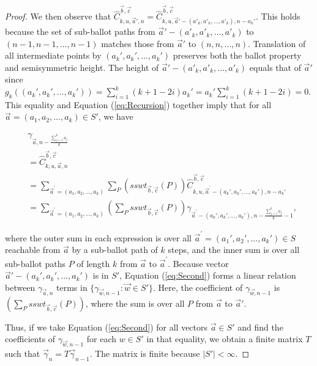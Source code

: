 \documentclass[11pt]{article}
\theoremstyle{remark}
\theoremstyle{definition}
\begin{document}
\begin{proof}
We then observe that $\widehat{C}_{k, u, \vec{a}', n}^{\vec{b}, \vec{c}} = \widehat{C}_{k, u, \vec{a}'-(a'_k, a'_k, \dots, a'_k), n-a_k'}^{\vec{b}, \vec{c}}$. This holds because the set of sub-ballot paths from $\vec{a}'-(a'_k, a'_k, \dots, a'_k)$ to $(n-1, n-1, \dots, n-1)$ matches those from $\vec{a}'$ to $(n, n, \dots, n)$. Translation of all intermediate points by $(a_k', a_k', \dots, a_k')$ preserves both the ballot property and semisymmetric height. The height of $\vec{a}'-(a'_k, a'_k, \dots, a'_k)$ equals that of $\vec{a}'$ since $g_k((a_k', a_k', \dots, a_k')) = \sum_{i=1}^k(k+1-2i)a_k' = a_k'\sum_{i=1}^k(k+1-2i) = 0$. This equality and Equation (\ref{eq:Recursion}) together imply that for all $\vec{a}=(a_1, a_2, \dots, a_k) \in S'$, we have

\begin{equation}\label{eq:Second}\begin{split}
     & \gamma_{\vec{a}, n -\frac{\sum_{j=1}^k a_j}{k}} \\ & = \widehat{C}_{k, u, \vec{a}, n}^{\vec{b}, \vec{c}} \\ & = \sum_{\vec{a}^{\prime} = (a_1, a_2, \dots, a_k)} \sum_{P} \left(sswt_{\vec{b}, \vec{c}}(P) \right)\widehat{C}_{k, u, \vec{a}^{\prime} - (a_k',a_k', \dots, a_k'), n-a_k'}^{\vec{b}, \vec{c}}   \\ & =\sum_{\vec{a}^{\prime}= (a_1, a_2, \dots, a_k)} \left(\sum_{P} sswt_{\vec{b}, \vec{c}}(P) \right)\gamma_{\vec{a}^{\prime} - (a_k', a_k', \dots, a_k'), n -\frac{\sum_{j=1}^k a_j}{k}-1},\end{split}
\end{equation}

where the outer sum in each expression is over all $\vec{a}^{\prime}=(a_1', a_2',\dots, a_k') \in S$ reachable from $\vec{a}$ by a sub-ballot path of $k$ steps, and the inner sum is over all sub-ballot paths $P$ of length $k$ from $\vec{a}$ to $\vec{a}^{\prime}$. Because vector $\vec{a}'-(a_k', a_k', \dots, a_k')$ is in $S'$, Equation (\ref{eq:Second}) forms a linear relation between $\gamma_{\vec{a}, n}$ terms in $\{\gamma_{\vec{w}, n-1}: \vec{w} \in S'\}$. Here, the coefficient of $\gamma_{\vec{w}, n-1}$ is $(\sum_{P}sswt_{\vec{b}, \vec{c}}(P))$, where the sum is over all $P$ from $\vec{a}$ to $\vec{a}'$.

Thus, if we take Equation (\ref{eq:Second}) for all vectors $\vec{a} \in S'$ and find the coefficients of $\gamma_{\vec{w}, n-1}$ for each $w \in S'$ in that equality, we obtain a finite matrix $T$ such that $\vec{\gamma}_n = T \vec{\gamma}_{n-1}$. The matrix is finite because $|S'| < \infty$.  


\end{proof}
\end{document}
